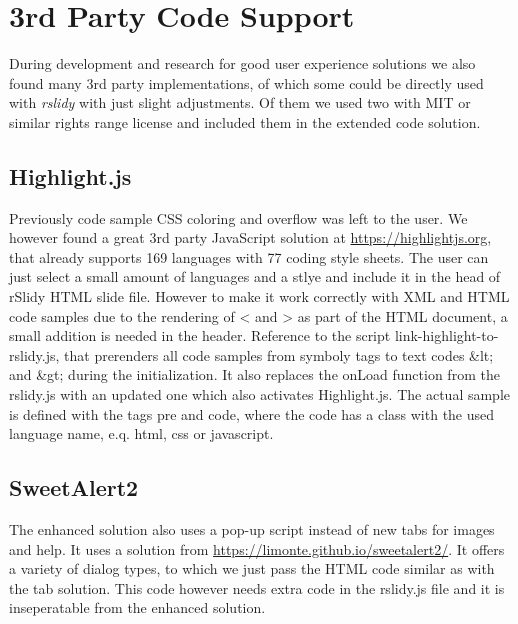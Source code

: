 %
%
% 
% 
% 


\chapter{3rd Party Code Support}

\label{chap:3rdParty}

During development and research for good user experience solutions we also 
found many 3rd party implementations, of which some could be directly used with 
\textit{rslidy} with just slight adjustments. Of them we used two with MIT or 
similar rights range license and included them in the extended code solution.

\section{Highlight.js}

Previously code sample CSS coloring and overflow was left to the user. We 
however found a great 3rd party JavaScript solution at \url{
https://highlightjs.org}, that already supports 169 languages with 77 coding 
style sheets. The user can just select a small amount of languages and a stlye 
and include it in the head of rSlidy HTML slide file. However to make it work 
correctly with XML and HTML code samples due to the rendering of < and > as 
part of the HTML document, a small addition is needed in the header. Reference 
to the script link-highlight-to-rslidy.js, that prerenders all code samples 
from symboly tags to text codes \&lt; and \&gt; during the initialization. It 
also replaces the onLoad function from the rslidy.js with an updated one which 
also activates Highlight.js. The actual sample is defined with the tags pre and 
code, where the code has a class with the used language name, e.q. html, css or 
javascript.

\section{SweetAlert2}

The enhanced solution also uses a pop-up script instead of new tabs for images 
and help. It uses a solution from \url{https://limonte.github.io/sweetalert2/}. 
It offers a variety of dialog types, to which we just pass the HTML code 
similar as with the tab solution. This code however needs extra code in the 
rslidy.js file and it is inseperatable from the enhanced solution.